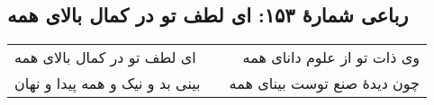 \begin{center}
\section*{رباعی شمارهٔ ۱۵۳: ای لطف تو در کمال بالای همه}
\label{sec:153}
\begin{longtable}{l p{0.5cm} r}
ای لطف تو در کمال بالای همه
&&
وی ذات تو از علوم دانای همه
\\
بینی بد و نیک و همه پیدا و نهان
&&
چون دیدهٔ صنع توست بینای همه
\\
\end{longtable}
\end{center}
